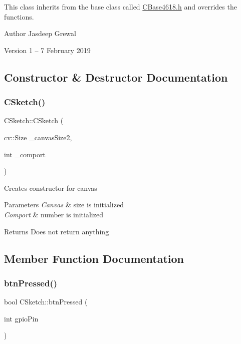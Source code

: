 This class inherits from the base class called \hyperlink{_c_base4618_8h_source}{C\+Base4618.\+h} and overrides the functions.

\begin{DoxyAuthor}{Author}
Jasdeep Grewal
\end{DoxyAuthor}
\begin{DoxyVersion}{Version}
1 -- 7 February 2019 
\end{DoxyVersion}


\subsection{Constructor \& Destructor Documentation}
\hypertarget{class_c_sketch_aa426bb25ef429d04103b180863dbc11a}{}\label{class_c_sketch_aa426bb25ef429d04103b180863dbc11a} 
\subsubsection{\texorpdfstring{C\+Sketch()}{CSketch()}}
{\footnotesize\ttfamily C\+Sketch\+::\+C\+Sketch (\begin{DoxyParamCaption}\item[{cv\+::\+Size}]{\+\_\+canvas\+Size2,  }\item[{int}]{\+\_\+comport }\end{DoxyParamCaption})}

Creates constructor for canvas


\begin{DoxyParams}{Parameters}
{\em Canvas} & size is initialized \\
\hline
{\em Comport} & number is initialized\\
\hline
\end{DoxyParams}
\begin{DoxyReturn}{Returns}
Does not return anything 
\end{DoxyReturn}


\subsection{Member Function Documentation}
\hypertarget{class_c_sketch_a9e73bdd4ab788236c1a682459d6a6075}{}\label{class_c_sketch_a9e73bdd4ab788236c1a682459d6a6075} 
\subsubsection{\texorpdfstring{btn\+Pressed()}{btnPressed()}}
{\footnotesize\ttfamily bool C\+Sketch\+::btn\+Pressed (\begin{DoxyParamCaption}\item[{int}]{gpio\+Pin }\end{DoxyParamCaption})}

